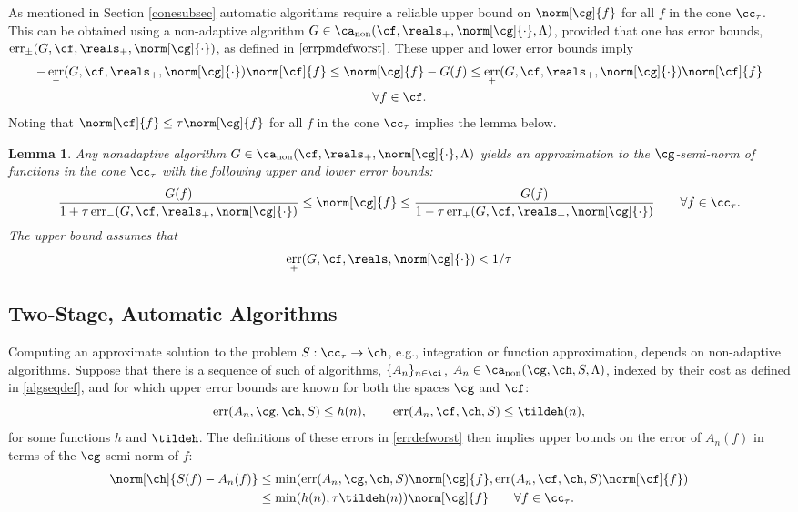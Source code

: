 \documentclass[final]{elsarticle}
\DeclareMathOperator{\err}{err}
\newtheorem{lem}[theorem]{Lemma}
\theoremstyle{definition}
\theoremstyle{remark}
\DeclareMathOperator{\fix}{non}
\begin{document}
As mentioned in Section \ref{conesubsec} automatic algorithms require a reliable upper bound on $\norm[\cg]{f}$ for all $f$ in the cone $\cc_{\tau}$. This can be obtained using a non-adaptive algorithm $G \in \ca_{\fix}(\cf,\reals_+,\norm[\cg]{\cdot},\Lambda)$, provided that one has error bounds, $\err_{\pm}(G,\cf,\reals_+,\norm[\cg]{\cdot})$, as defined in $\eqref{errpmdefworst}$.  These upper and lower error bounds imply 
\begin{multline*}
-\err_{-}(G,\cf,\reals_{+},\norm[\cg]{\cdot}) \norm[\cf]{f} \le \norm[\cg]{f}-G(f) \le \err_{+}(G,\cf,\reals_{+},\norm[\cg]{\cdot}) \norm[\cf]{f} \\ \forall f \in \cf.
\end{multline*}
Noting that $\norm[\cf]{f} \le \tau \norm[\cg]{f}$ for all $f$ in the cone $\cc_{\tau}$ implies the lemma below. 

\begin{lem} \label{Gnormlem} Any nonadaptive algorithm $G \in \ca_{\fix}(\cf,\reals_+,\norm[\cg]{\cdot},\Lambda)$ yields an approximation to the $\cg$-semi-norm of functions in the cone $\cc_{\tau}$ with the following upper and lower error bounds:
\begin{equation*}
\frac{G(f)}{1 + \tau \err_{-}(G,\cf,\reals_+,\norm[\cg]{\cdot})} \le \norm[\cg]{f} \le \frac{G(f)}{1 - \tau \err_{+}(G,\cf,\reals_+,\norm[\cg]{\cdot})} \qquad \forall f \in \cc_{\tau}.
\end{equation*}
The upper bound assumes that  
\begin{equation} \label{Gtaucond}
\err_{+}(G,\cf,\reals,\norm[\cg]{\cdot}) < 1/\tau
\end{equation}
\end{lem}

\subsection{Two-Stage, Automatic Algorithms}

Computing an approximate solution to the problem $S: \cc_{\tau} \to \ch$, e.g., integration or function approximation, depends on non-adaptive algorithms. Suppose that there is a sequence of such of algorithms, $\{A_n\}_{n \in \ci}$, $A_n  \in \ca_{\fix}(\cg,\ch,S,\Lambda)$, indexed by their cost as defined in \eqref{algseqdef}, and for which upper error bounds are known for both the spaces $\cg$ and $\cf$:
\begin{equation}\label{algseqerrbd}
\err(A_n,\cg,\ch,S) \le h(n), \qquad \err(A_n,\cf,\ch,S) \le \tildeh(n), 
\end{equation}
for some functions $h$ and $\tildeh$.  The definitions of these errors in \eqref{errdefworst} then implies upper bounds on the error of $A_n(f)$ in terms of the $\cg$-semi-norm of $f$:
\begin{align} \nonumber
\norm[\ch]{S(f) -  A_n(f)} &\le \min(\err(A_n,\cg,\ch,S)\norm[\cg]{f},\err(A_n,\cf,\ch,S)\norm[\cf]{f}) \\
\label{Anerrbound}
&\le \min(h(n),\tau \tildeh(n))\norm[\cg]{f} \qquad \forall f \in \cc_{\tau}.
\end{align}
\end{document}
